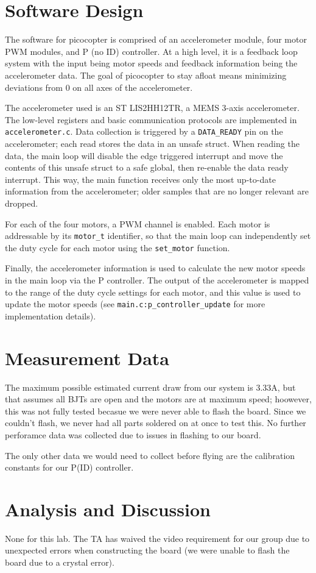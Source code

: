 \documentclass{article}
\begin{document}
\section{Software Design}

The software for picocopter is comprised of an accelerometer module, four motor
PWM modules, and P (no ID) controller. At a high level, it is a feedback loop
system with the input being motor speeds and feedback information being the
accelerometer data. The goal of picocopter to stay afloat means minimizing
deviations from 0 on all axes of the accelerometer.

The accelerometer used is an ST LIS2HH12TR, a MEMS 3-axis accelerometer. The
low-level registers and basic communication protocols are implemented in
\texttt{accelerometer.c}. Data collection is triggered by a \texttt{DATA\_READY}
pin on the accelerometer; each read stores the data in an unsafe struct. When
reading the data, the main loop will disable the edge triggered interrupt and
move the contents of this unsafe struct to a safe global, then re-enable
the data ready interrupt. This way, the main function receives only the most
up-to-date information from the accelerometer; older samples that are no longer
relevant are dropped.

For each of the four motors, a PWM channel is enabled. Each motor is
addressable by its \texttt{motor\_t} identifier, so that the main loop can
independently set the duty cycle for each motor using the \texttt{set\_motor}
function.

Finally, the accelerometer information is used to calculate the new motor
speeds in the main loop via the P controller. The output of the accelerometer
is mapped to the range of the duty cycle settings for each motor, and this
value is used to update the motor speeds (see
\texttt{main.c:p\_controller\_update} for more implementation details).


\section{Measurement Data}

The maximum possible estimated current draw from our system is 3.33A, but that assumes all BJTs are open and the motors are at maximum speed; hoowever, this was not fully tested becasue we were never able to flash the board. Since we couldn't flash, we never had all parts soldered on at once to test this. No further perforamce data was collected due to issues in flashing to our board.

The only other data we would need to collect before flying are the calibration constants for our P(ID) controller.

\section{Analysis and Discussion}
None for this lab. The TA has waived the video requirement for our group due to unexpected errors when constructing the board (we were unable to flash the board due to a crystal error).
\end{document}
